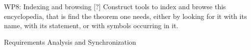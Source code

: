 \begin{workpackage}[id=structuring,wphases=0-48,type=RTD,
  short=Structured theories,%
  title=Structured theories,
  lead=FAU,
  FAURM=36,USaRM=36]
\begin{wpdescription}
WP8: Indexing and browsing [?]  Construct tools to index and browse
this encyclopedia, that is find the theorem one needs, either by
looking for it with its name, with its statement, or with symbols
occurring in it.
\end{wpdescription}

\begin{tasklist}
\begin{task}[id=modules,title=Module Systems]
\end{task}
\end{tasklist}

\begin{wpdelivs}
  \begin{wpdeliv}[due=3,miles=startup,id=requirements,dissem=PU,nature=DEM,lead=Inr]
      {Requirements Analysis and Synchronization}
\end{wpdeliv}
\end{wpdelivs}
\end{workpackage}

